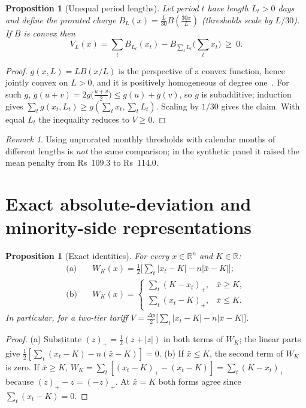 \documentclass[11pt,a4paper]{article}
\newtheorem{proposition}{Proposition}
\theoremstyle{definition}
\theoremstyle{plain}\newtheorem{sprop}{Proposition}[section]\newtheorem{slemma}[sprop]{Lemma}\newtheorem{scor}[sprop]{Corollary}
\theoremstyle{definition}
\theoremstyle{remark}
\newtheorem{remark}{Remark}
\newcommand{\xbar}{\bar{x}}
\newcommand{\pos}[1]{\left(#1\right)_{+}}
\numberwithin{equation}{section}
\begin{document}
\begin{sprop}[Unequal period lengths]\label{prop:perspective}
Let period $t$ have length $L_t>0$ days and define the prorated charge $B_L(x)=\frac{L}{30}B\!\left(\frac{30x}{L}\right)$ (thresholds scale by $L/30$). If $B$ is convex then
\[
V_L(x)=\sum_tB_{L_t}(x_t)-B_{\sum_tL_t}\Big(\sum_tx_t\Big)\ \ge\ 0 .
\]
\end{sprop}
\begin{proof}
$g(x,L)=LB(x/L)$ is the perspective of a convex function, hence jointly convex on $L>0$, and it is positively homogeneous of degree one~\cite{boyd}. For such $g$, $g(u+v)=2g\big(\tfrac{u+v}{2}\big)\le g(u)+g(v)$, so $g$ is subadditive; induction gives $\sum_tg(x_t,L_t)\ge g(\sum_tx_t,\sum_tL_t)$. Scaling by $1/30$ gives the claim. With equal $L_t$ the inequality reduces to $V\ge0$.
\end{proof}

\begin{remark}
Using unprorated monthly thresholds with calendar months of different lengths is \emph{not} the same comparison; in the synthetic panel it raised the mean penalty from Rs~109.3 to Rs~114.0.
\end{remark}

\section{Exact absolute-deviation and minority-side representations}\label{sec:S3}

\setcounter{proposition}{1}\begin{proposition}[Exact identities]\label{prop:ident}
For every $x\in\mathbb R^n$ and $K\in\mathbb R$:
\begin{align}
\text{(a)}\quad & W_K(x)=\tfrac12\Big[\sum_t|x_t-K|-n|\xbar-K|\Big];\label{eq:abs}\\
\text{(b)}\quad & W_K(x)=\begin{cases}\sum_t\pos{K-x_t}, & \xbar\ge K,\\ \sum_t\pos{x_t-K}, & \xbar\le K.\end{cases}\label{eq:minority}
\end{align}
In particular, for a two-tier tariff $V=\frac{\Delta p}{2}\big[\sum_t|x_t-K|-n|\xbar-K|\big]$.
\end{proposition}
\begin{proof}
(a) Substitute $\pos z=\frac12(z+|z|)$ in both terms of $W_K$; the linear parts give $\frac12[\sum_t(x_t-K)-n(\xbar-K)]=0$. (b) If $\xbar\le K$, the second term of $W_K$ is zero. If $\xbar\ge K$, $W_K=\sum_t[\pos{x_t-K}-(x_t-K)]=\sum_t\pos{K-x_t}$ because $\pos z-z=\pos{-z}$. At $\xbar=K$ both forms agree since $\sum_t(x_t-K)=0$.
\end{proof}
\end{document}
